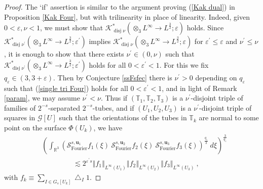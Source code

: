 \documentclass[10pt,a4paper]{amsart}
\begin{document}
\begin{proof}
The `if' assertion is similar to the argument proving (\ref{Kak dual}) in
Proposition \ref{Kak Four}, but with trilinearity in place of linearity.
Indeed, given $0<\varepsilon,\nu<1$, we must show that $\mathcal{K}%
_{\operatorname*{disj}\nu}^{\ast}\left(  \otimes_{3}L^{\infty}\rightarrow
L^{\frac{3}{2}};\varepsilon\right)  $ holds. Since $\mathcal{K}%
_{\operatorname*{disj}\nu^{\prime}}^{\ast}\left(  \otimes_{3}L^{\infty
}\rightarrow L^{\frac{3}{2}};\varepsilon^{\prime}\right)  $ implies
$\mathcal{K}_{\operatorname*{disj}\nu}^{\ast}\left(  \otimes_{3}L^{\infty
}\rightarrow L^{\frac{3}{2}};\varepsilon\right)  $ for $\varepsilon^{\prime
}\leq\varepsilon$ and $\nu^{\prime}\leq\nu$, it is enough to show that there
exists $\nu^{\prime}\in\left(  0,\nu\right)  $ such that $\mathcal{K}%
_{\operatorname*{disj}\nu^{\prime}}^{\ast}\left(  \otimes_{3}L^{\infty
}\rightarrow L^{\frac{3}{2}};\varepsilon^{\prime}\right)  $ holds for all
$0<\varepsilon^{\prime}<1 $. For this we fix $q_{\varepsilon}\in\left(
3,3+\varepsilon\right)  $. Then by Conjecture \ref{ssFsfec} there is
$\nu^{\prime}>0$ depending on $q_{\varepsilon}$ such that
(\ref{single tri Four}) holds for all $0<\varepsilon^{\prime}<1$, and in light
of Remark \ref{param}, we may assume $\nu^{\prime}<\nu$. Thus if $\left(
\mathbb{T}_{1},\mathbb{T}_{2},\mathbb{T}_{3}\right)  $ is a $\nu^{\prime}%
$-disjoint triple of families of $2^{-s}$-separated $2^{-s}$-tubes, and if
$\left(  U_{1},U_{2},U_{3}\right)  $ is a $\nu^{\prime}$-disjoint triple of
squares in $\mathcal{G}\left[  U\right]  $ such that the orientations of the
tubes in $\mathbb{T}_{k}$ are normal to some point on the surface $\Phi\left(
U_{k}\right)  $, we have%
\begin{align*}
&  \left(  \int_{\mathbb{R}^{3}}\left(  \mathcal{S}_{\operatorname*{Fourier}%
}^{s,\mathbf{u}_{1}}f_{1}\left(  \xi\right)  \ \mathcal{S}%
_{\operatorname*{Fourier}}^{s,\mathbf{u}_{2}}f_{2}\left(  \xi\right)
\ \mathcal{S}_{\operatorname*{Fourier}}^{s,\mathbf{u}_{3}}f_{3}\left(
\xi\right)  \right)  ^{\frac{q_{\varepsilon}}{3}}\ d\xi\right)  ^{\frac
{3}{q_{\varepsilon}}}\\
&  \ \ \ \ \ \ \ \ \ \ \ \ \ \ \ \ \ \ \ \ \lesssim2^{\varepsilon^{\prime}%
s}\left\Vert f_{1}\right\Vert _{L^{\infty}\left(  U_{1}\right)  }\left\Vert
f_{2}\right\Vert _{L^{\infty}\left(  U_{2}\right)  }\left\Vert f_{3}%
\right\Vert _{L^{\infty}\left(  U_{3}\right)  }\ ,
\end{align*}
with $f_{k}\equiv\sum_{I\in G_{s}\left[  U_{k}\right]  }\bigtriangleup_{I}1$.

\end{proof}
\end{document}
